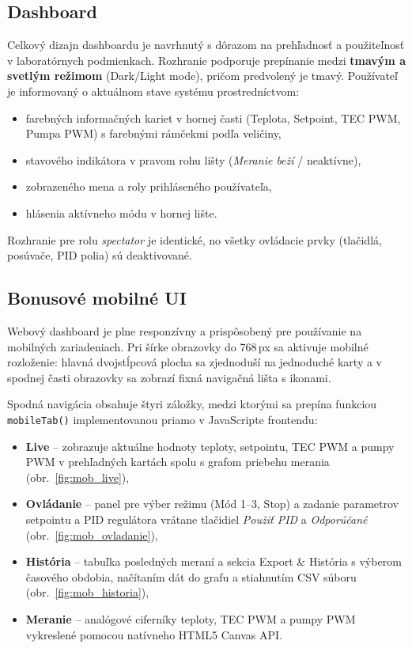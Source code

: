 \subsection{Dashboard}

Celkový dizajn dashboardu je navrhnutý s dôrazom na prehľadnosť a použiteľnosť
v laboratórnych podmienkach. Rozhranie podporuje prepínanie medzi \textbf{tmavým
a svetlým režimom} (Dark/Light mode), pričom predvolený je tmavý. Používateľ
je informovaný o aktuálnom stave systému prostredníctvom:
\begin{itemize}
  \item farebných informačných kariet v hornej časti (Teplota, Setpoint, TEC PWM,
        Pumpa PWM) s farebnými rámčekmi podľa veličiny,
  \item stavového indikátora v pravom rohu lišty (\textit{Meranie beží} / neaktívne),
  \item zobrazeného mena a roly prihláseného používateľa,
  \item hlásenia aktívneho módu v hornej lište.
\end{itemize}

Rozhranie pre rolu \textit{spectator} je identické, no všetky ovládacie prvky
(tlačidlá, posúvače, PID polia) sú deaktivované.

\subsection{Bonusové mobilné UI}

Webový dashboard je plne responzívny a prispôsobený pre používanie na mobilných zariadeniach.
Pri šírke obrazovky do 768\,px sa aktivuje mobilné rozloženie: hlavná dvojstĺpcová plocha
sa zjednoduší na jednoduché karty a v spodnej časti obrazovky sa zobrazí fixná
navigačná lišta s ikonami.

Spodná navigácia obsahuje štyri záložky, medzi ktorými sa prepína funkciou \texttt{mobileTab()}
implementovanou priamo v JavaScripte frontendu:

\begin{itemize}
    \item \textbf{Live} – zobrazuje aktuálne hodnoty teploty, setpointu, TEC PWM a pumpy PWM
          v prehľadných kartách spolu s grafom priebehu merania (obr.~\ref{fig:mob_live}),
    \item \textbf{Ovládanie} – panel pre výber režimu (Mód 1--3, Stop) a zadanie parametrov
          setpointu a PID regulátora vrátane tlačidiel \emph{Použiť PID} a \emph{Odporúčané}
          (obr.~\ref{fig:mob_ovladanie}),
    \item \textbf{História} – tabuľka posledných meraní a sekcia Export \& História
          s výberom časového obdobia, načítaním dát do grafu a stiahnutím CSV súboru
          (obr.~\ref{fig:mob_historia}),
    \item \textbf{Meranie} – analógové ciferníky teploty, TEC PWM a pumpy PWM vykreslené
          pomocou natívneho HTML5 Canvas API.
\end{itemize}

